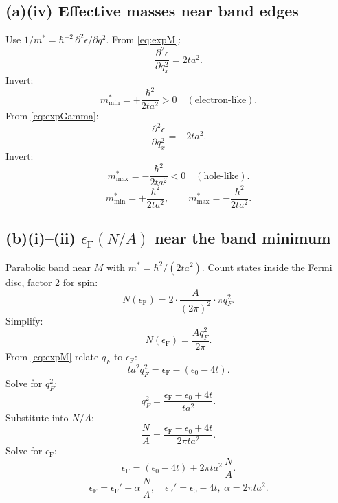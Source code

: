 \documentclass[11pt]{article}
\newcommand{\eF}{\epsilon_{\mathrm{F}}}
\begin{document}
\begin{center}
\end{center}

\subsection*{(a)(iv) Effective masses near band edges}

Use $1/m^* = \hbar^{-2}\,\partial^2\epsilon/\partial q^2$. From \eqref{eq:expM}:
\[
\frac{\partial^2 \epsilon}{\partial q_x^2} = 2ta^2.
\]
Invert:
\[
m^*_{\mathrm{min}} = +\frac{\hbar^2}{2ta^2} > 0\quad(\text{electron-like}).
\]
From \eqref{eq:expGamma}:
\[
\frac{\partial^2 \epsilon}{\partial q_x^2} = -2ta^2.
\]
Invert:
\[
m^*_{\mathrm{max}} = -\frac{\hbar^2}{2ta^2} < 0\quad(\text{hole-like}).
\]
\begin{equation}
\boxed{\ m^*_{\mathrm{min}} = +\frac{\hbar^2}{2ta^2},\qquad m^*_{\mathrm{max}} = -\frac{\hbar^2}{2ta^2}.\ }
\label{eq:meffbox}
\end{equation}

\subsection*{(b)(i)--(ii) $\eF(N/A)$ near the band minimum}

Parabolic band near $M$ with $m^*=\hbar^2/(2ta^2)$. Count states inside the Fermi disc, factor 2 for spin:
\[
N(\eF) = 2\cdot\frac{A}{(2\pi)^2}\cdot \pi q_F^2.
\]
Simplify:
\[
N(\eF) = \frac{A q_F^2}{2\pi}.
\]
From \eqref{eq:expM} relate $q_F$ to $\eF$:
\[
ta^2 q_F^2 = \eF - (\epsilon_0 - 4t).
\]
Solve for $q_F^2$:
\[
q_F^2 = \frac{\eF - \epsilon_0 + 4t}{ta^2}.
\]
Substitute into $N/A$:
\[
\frac{N}{A} = \frac{\eF - \epsilon_0 + 4t}{2\pi t a^2}.
\]
Solve for $\eF$:
\[
\eF = (\epsilon_0 - 4t) + 2\pi t a^2\,\frac{N}{A}.
\]
\begin{equation}
\boxed{\ \eF = \eF' + \alpha\,\frac{N}{A},\quad \eF'=\epsilon_0-4t,\ \alpha = 2\pi t a^2.\ }
\label{eq:eFlinear}
\end{equation}
\end{document}
